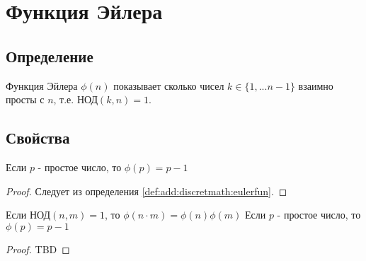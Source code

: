 \section{Функция Эйлера}

\subsection{Определение}
\begin{definition}
Функция Эйлера $\phi\left(n\right)$ показывает сколько чисел $k \in
\{1, ... n-1\}$ взаимно просты с $n$, т.е. $\mbox{НОД}\left(k,
n\right) = 1$.
\label{def:add:discretmath:eulerfun}
\end{definition}

\subsection{Свойства}

\begin{property}
Если $p$ - простое число, то $\phi(p) = p - 1$
\begin{proof}
Следует из определения \ref{def:add:discretmath:eulerfun}.
\end{proof}
\label{prop:add:discretmath:eulerfun1}
\end{property}


\begin{property}
Если $\mbox{НОД}\left(n, m\right) = 1$, то
$\phi\left(n \cdot m\right) = \phi\left(n\right) \phi\left( m\right)$
Если $p$ - простое число, то $\phi(p) = p - 1$
\begin{proof}
TBD
\end{proof}
\label{prop:add:discretmath:eulerfun2}
\end{property}
